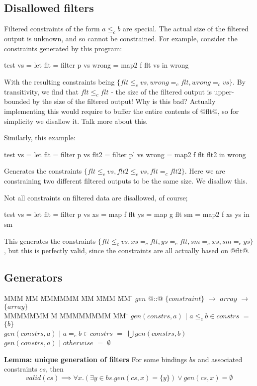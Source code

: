 \subsection{Disallowed filters}

Filtered constraints of the form $a \le_c b$ are special.
The actual size of the filtered output is unknown, and so cannot be constrained.
For example, consider the constraints generated by this program:
\begin{code}
test vs    =
 let flt   = filter p vs
     wrong = map2   f flt vs
 in  wrong
\end{code}
With the resulting constraints being $\{flt \le_c vs, wrong =_c flt, wrong =_c vs\}$.
By transitivity, we find that $flt \le_c flt$ - the size of the filtered output is upper-bounded by the size of the filtered output! 
Why is this bad?
Actually implementing this would require to buffer the entire contents of @flt@, so for simplicity we disallow it. Talk more about this.   

Similarly, this example:
\begin{code}
test vs    =
 let flt   = filter p  vs
     flt2  = filter p' vs
     wrong = map2   f  flt flt2
 in  wrong
\end{code}
Generates the constraints $\{flt \le_c vs, flt2 \le_c vs, flt =_c flt2\}$.
Here we are constraining two different filtered outputs to be the same size.
We disallow this.

Not all constraints on filtered data are disallowed, of course;
\begin{code}
test vs    =
 let flt   = filter p  vs
     xs    = map    f  flt
     ys    = map    g  flt
     sm    = map2   f  xs ys
 in  sm
\end{code}
This generates the constraints $\{flt \le_c vs, xs =_c flt, ys =_c flt, sm =_c xs, sm =_c ys\}$,
but this is perfectly valid, since the constraints are all actually based on @flt@.



\subsection{Generators}

\begin{tabbing}
MMM       \= MM \= MMMMMM \= MM \= MMM \= MM \= \kill
$gen$   \> @::@  \> $\{constraint\}$  \> $\to$ \> $array$ \> $\to$ \> $\{array\}$ \\
MMMMMMM                 \= M  \= MMMMMMMM \= MM \= \kill
$gen(constrs, a)$ \> $|$ \> $a \le_c b \in constrs$ \> $=$ \> $\{b\}$                        \\
$gen(constrs, a)$ \> $|$ \> $a =_c b \in constrs$   \> $=$ \> $\bigcup gen(constrs, b)$                        \\
$gen(constrs, a)$ \> $|$ \> $otherwise$             \> $=$ \> $\emptyset$                        \\
\end{tabbing}

\textbf{Lemma: unique generation of filters}
For some bindings $bs$ and associated constraints $cs$, then
\[
valid(cs) \implies \forall x. (\exists y \in bs. gen(cs, x) = \{y\}) \vee gen(cs, x) = \emptyset
\]

